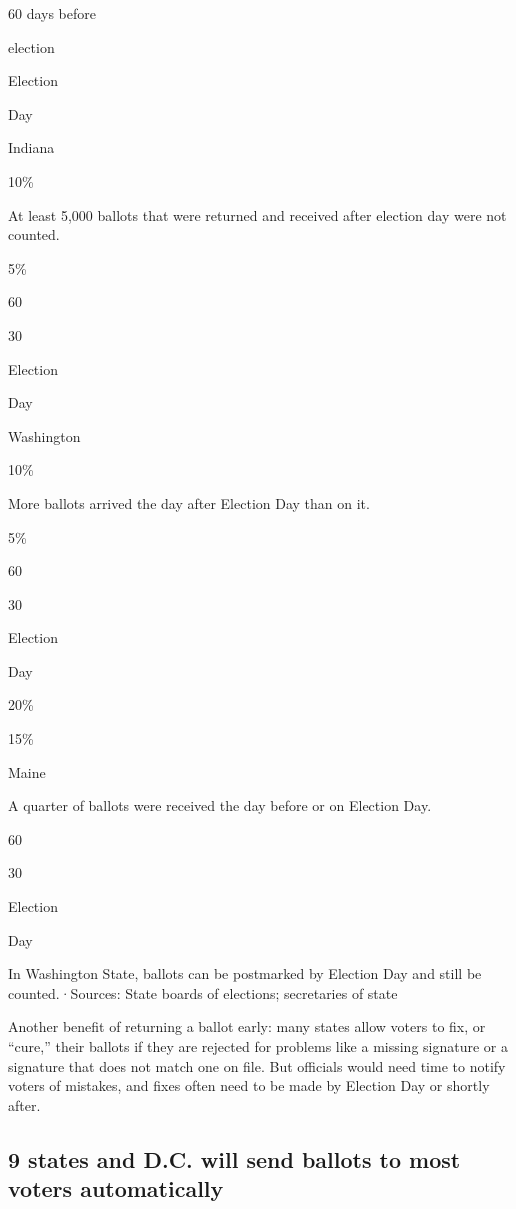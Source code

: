 60 days before

election

Election

Day

Indiana

10\%

At least 5,000 ballots that were returned and received after election
day were not counted.

5\%

60

30

Election

Day

Washington

10\%

More ballots arrived the day after Election Day than on it.

5\%

60

30

Election

Day

20\%

15\%

Maine

A quarter of ballots were received the day before or on Election Day.

60

30

Election

Day

In Washington State, ballots can be postmarked by Election Day and still
be counted.·Sources: State boards of elections; secretaries of state

Another benefit of returning a ballot early: many states allow voters to
fix, or ``cure,'' their ballots if they are rejected for problems like a
missing signature or a signature that does not match one on file. But
officials would need time to notify voters of mistakes, and fixes often
need to be made by Election Day or shortly after.

\hypertarget{9-states-and-dc-will-send-ballots-to-most-voters-automatically}{%
\subsection{\texorpdfstring{9 states and D.C. \textbf{will send ballots
to most voters}
automatically}{9 states and D.C. will send ballots to most voters automatically}}\label{9-states-and-dc-will-send-ballots-to-most-voters-automatically}}

